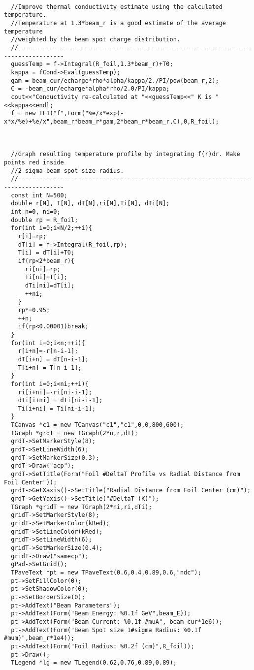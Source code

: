 \documentclass[12pt]{article}
\begin{document}
\begin{lstlisting}
  
  //Improve thermal conductivity estimate using the calculated temperature.
  //Temperature at 1.3*beam_r is a good estimate of the average temperature
  //weighted by the beam spot charge distribution.
  //-----------------------------------------------------------------------------------
  guessTemp = f->Integral(R_foil,1.3*beam_r)+T0;
  kappa = fCond->Eval(guessTemp);
  gam = beam_cur/echarge*rho*alpha/kappa/2./PI/pow(beam_r,2);
  C = -beam_cur/echarge*alpha*rho/2.0/PI/kappa;
  cout<<"Conductivity re-calculated at "<<guessTemp<<" K is "<<kappa<<endl;
  f = new TF1("f",Form("%e/x*exp(-x*x/%e)+%e/x",beam_r*beam_r*gam,2*beam_r*beam_r,C),0,R_foil);



  //Graph resulting temperature profile by integrating f(r)dr. Make points red inside
  //2 sigma beam spot size radius.
  //-----------------------------------------------------------------------------------
  const int N=500;
  double r[N], T[N], dT[N],ri[N],Ti[N], dTi[N];
  int n=0, ni=0;
  double rp = R_foil;
  for(int i=0;i<N/2;++i){
    r[i]=rp;
    dT[i] = f->Integral(R_foil,rp);
    T[i] = dT[i]+T0;
    if(rp<2*beam_r){
      ri[ni]=rp;
      Ti[ni]=T[i];
      dTi[ni]=dT[i];
      ++ni;
    }
    rp*=0.95;
    ++n;
    if(rp<0.00001)break;
  }
  for(int i=0;i<n;++i){
    r[i+n]=-r[n-i-1];
    dT[i+n] = dT[n-i-1];
    T[i+n] = T[n-i-1];
  }
  for(int i=0;i<ni;++i){
    ri[i+ni]=-ri[ni-i-1];
    dTi[i+ni] = dTi[ni-i-1];
    Ti[i+ni] = Ti[ni-i-1];
  }
  TCanvas *c1 = new TCanvas("c1","c1",0,0,800,600);
  TGraph *grdT = new TGraph(2*n,r,dT);
  grdT->SetMarkerStyle(8);
  grdT->SetLineWidth(6);
  grdT->SetMarkerSize(0.3);
  grdT->Draw("acp");
  grdT->SetTitle(Form("Foil #DeltaT Profile vs Radial Distance from Foil Center"));
  grdT->GetXaxis()->SetTitle("Radial Distance from Foil Center (cm)");
  grdT->GetYaxis()->SetTitle("#DeltaT (K)");
  TGraph *gridT = new TGraph(2*ni,ri,dTi);
  gridT->SetMarkerStyle(8);
  gridT->SetMarkerColor(kRed);
  gridT->SetLineColor(kRed);
  gridT->SetLineWidth(6);
  gridT->SetMarkerSize(0.4);
  gridT->Draw("samecp");
  gPad->SetGrid();
  TPaveText *pt = new TPaveText(0.6,0.4,0.89,0.6,"ndc");
  pt->SetFillColor(0);
  pt->SetShadowColor(0);
  pt->SetBorderSize(0);
  pt->AddText("Beam Parameters");
  pt->AddText(Form("Beam Energy: %0.1f GeV",beam_E));
  pt->AddText(Form("Beam Current: %0.1f #muA", beam_cur*1e6));
  pt->AddText(Form("Beam Spot size 1#sigma Radius: %0.1f #mum)",beam_r*1e4));
  pt->AddText(Form("Foil Radius: %0.2f (cm)",R_foil));
  pt->Draw();
  TLegend *lg = new TLegend(0.62,0.76,0.89,0.89);

\end{lstlisting}
\end{document}
